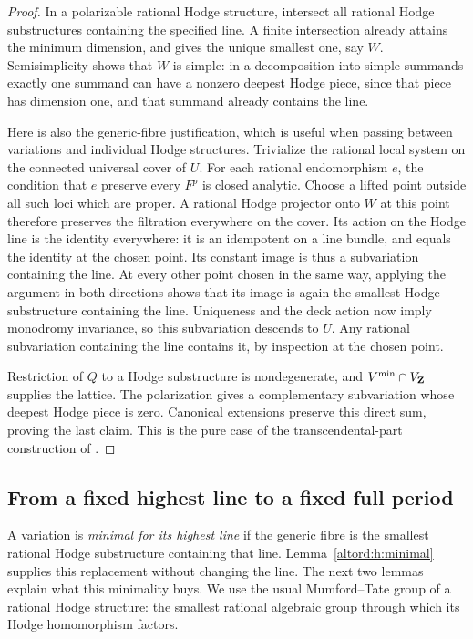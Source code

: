 \begin{proof}
In a polarizable rational Hodge structure, intersect all rational Hodge
substructures containing the specified line. A finite intersection
already attains the minimum dimension, and gives the unique smallest
one, say $W$. Semisimplicity shows that $W$ is simple: in a decomposition
into simple summands exactly one summand can have a nonzero deepest
Hodge piece, since that piece has dimension one, and that summand already
contains the line.

Here is also the generic-fibre justification, which is useful when
passing between variations and individual Hodge structures. Trivialize
the rational local system on the connected universal cover of $U$.
For each rational endomorphism $e$, the condition that $e$ preserve every
$F^p$ is closed analytic. Choose a lifted point outside all such loci
which are proper. A rational Hodge projector onto $W$ at this point
therefore preserves the filtration everywhere on the cover. Its action
on the Hodge line is the identity everywhere: it is an idempotent on a
line bundle, and equals the identity at the chosen point. Its constant
image is thus a subvariation containing the line. At every other point
chosen in the same way, applying the argument in both directions shows
that its image is again the smallest Hodge substructure containing the
line. Uniqueness and the deck action now imply monodromy invariance,
so this subvariation descends to $U$. Any rational subvariation containing
the line contains it, by inspection at the chosen point.

Restriction of $Q$ to a Hodge substructure is nondegenerate, and
$V^{\min}\cap V_{\mathbf Z}$ supplies the lattice. The polarization gives a
complementary subvariation whose deepest Hodge piece is zero.
Canonical extensions preserve this direct sum, proving the last claim.
This is the pure case of the transcendental-part construction of
\cite[Definition~2.9]{BFMT}.
\end{proof}

\subsection{From a fixed highest line to a fixed full period}
A variation is \emph{minimal for its highest line} if the generic
fibre is the smallest rational Hodge substructure containing that
line. Lemma~\ref{altord:h:minimal} supplies this replacement without
changing the line. The next two lemmas explain what this minimality
buys. We use the usual Mumford--Tate group of a rational Hodge
structure: the smallest rational algebraic group through which its
Hodge homomorphism factors.

